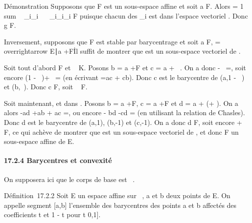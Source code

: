 \documentclass[]{article}
\begin{document}
Démonstration Supposons que F est un sous-espace affine et soit a \in F.
Alors \overrightarrowag = 1 \over
\\sum ~
_i\inI\lambda_i \
\sum ~
_i\inI\lambda_i\overrightarrowaa_i
\in\overrightarrow F puisque chacun des
\overrightarrowaa_i est dans l'espace
vectoriel \overrightarrowF. Donc g \in F.

Inversement, supposons que F est stable par barycentrage et soit a \in F,
\overrightarrowF =
\\overrightarrow\xi
\in\overrightarrow E∣a
+\overrightarrow \xi \in F\. Il suffit
de montrer que \overrightarrowF est un sous-espace
vectoriel de \overrightarrowE.

Soit tout d'abord \overrightarrow\xi
\in\overrightarrow F et \lambda~ \in K. Posons b = a
+\overrightarrow \xi \in F et c = a +
\lambda~\overrightarrow\xi. On a donc
\overrightarrowac -
\lambda~\overrightarrowab =, soit encore (1 - \lambda~)\overrightarrowac +
\lambda~\overrightarrowbc = (en écrivant \overrightarrowab
=\overrightarrow ac +\overrightarrow
cb). Donc c est le barycentre de (a,1 - \lambda~) et (b,\lambda~). Donc c \in F, soit
\lambda~\overrightarrow\xi \in\overrightarrow
F.

Soit maintenant, \overrightarrow\xi et
\overrightarrow\eta dans
\overrightarrowF. Posons b = a
+\overrightarrow \xi \in F, c = a
+\overrightarrow \eta \in F et d = a +
(\overrightarrow\xi +\overrightarrow
\eta). On a alors -\overrightarrow ad
+\overrightarrow ab +\overrightarrow
ac =, ou encore
\overrightarrowad -\overrightarrow
bd -\overrightarrow cd
= (en utilisant la relation de
Chasles). Donc d est le barycentre de (a,1), (b,-1) et (c,-1). On a donc
d \in F, soit encore \overrightarrow\xi
+\overrightarrow \eta \in{}, ce qui achève de montrer que \overrightarrowF
est un sous-espace vectoriel de \overrightarrowE, et
donc F un sous-espace affine de E.

\paragraph{17.2.4 Barycentres et convexité}

On supposera ici que le corps de base est ~.

Définition~17.2.2 Soit E un espace affine sur ~, a et b deux points de
E. On appelle segment {[}a,b{]} l'ensemble des barycentres des points a
et b affectés des coefficients t et 1 - t pour t \in {[}0,1{]}.
\end{document}
